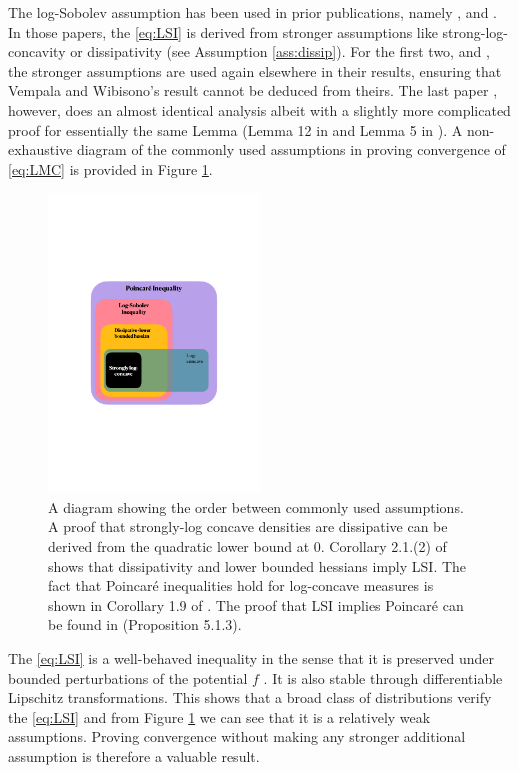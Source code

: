 \documentclass[11pt,twoside]{article}
\theoremstyle{definition}
\begin{document}
The log-Sobolev assumption has been used in prior publications, namely \cite{dalalyan_theoretical_2014},  \cite{raginsky_non-convex_2017} and \cite{ma_sampling_2019}. In those papers, the \eqref{eq:LSI} is derived from stronger assumptions like strong-log-concavity or dissipativity (see Assumption \ref{ass:dissip}). For the first two, \cite{dalalyan_theoretical_2014} and \cite{raginsky_non-convex_2017}, the stronger assumptions are used again elsewhere in their results, ensuring that Vempala and Wibisono's result cannot be deduced from theirs. The last paper \cite{ma_sampling_2019}, however, does an almost identical analysis albeit with a slightly more complicated proof for essentially the same Lemma (Lemma 12 in \cite{vempala_rapid_2019} and Lemma 5 in \cite{ma_sampling_2019}). A non-exhaustive diagram of the commonly used assumptions in proving convergence of \eqref{eq:LMC} is provided in Figure \ref{fig:diagram}.
\begin{figure}
    \centering
    \includegraphics[width=0.5\textwidth]{diagram.pdf}
    \caption{A diagram showing the order between commonly used assumptions.  A proof that strongly-log concave densities are dissipative can be derived from the quadratic lower bound at $0$. Corollary 2.1.(2) of \cite{cattiaux_note_2010} shows that dissipativity and lower bounded hessians imply LSI. The fact that Poincar\'e inequalities  hold for log-concave measures is shown in Corollary 1.9 of \cite{bakry_simple_2008}. The proof that LSI implies Poincar\'e can be found in \cite{bakry_markov_2014}(Proposition 5.1.3).}
    \label{fig:diagram}
\end{figure}

The \eqref{eq:LSI} is a well-behaved inequality in the sense that it is preserved under bounded perturbations of the potential $f$ \cite{ane_sur_2000}. It is also stable through differentiable Lipschitz transformations. This shows that a broad class of distributions verify the \eqref{eq:LSI} and from Figure \ref{fig:diagram} we can see that it is a relatively weak assumptions. Proving convergence without making any stronger additional assumption is therefore a valuable result.
\end{document}
